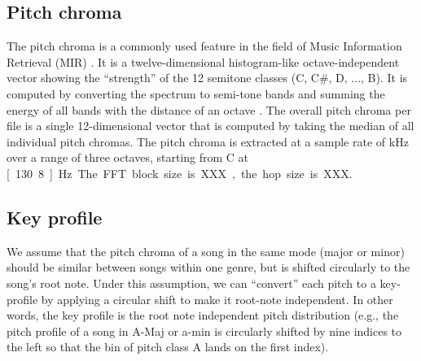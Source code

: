 \documentclass{article}
\begin{document}
\subsection{Pitch chroma}\label{subsec:pc_extract}
The pitch chroma is a commonly used feature in the field of Music Information Retrieval (MIR) \cite{muller_information_2007}. It is a twelve-dimensional histogram-like octave-independent vector showing the “strength” of the 12 semitone classes (C, C\#, D, ..., B). It is computed by converting the spectrum to semi-tone bands and summing the energy of all bands with the distance of an octave \cite{fujishima_realtime_1999}. The overall pitch chroma per file is a single 12-dimensional vector that is computed by taking the median of all individual pitch chromas. 
The pitch chroma is extracted at a sample rate of \unit[10]{kHz} over a range of three octaves, starting from C at \unit[130.8]{Hz}. The FFT block size is XXX, the hop size is XXX.



\subsection{Key profile}
We assume that the pitch chroma of a song in the same mode (major or minor) should be similar between songs within one genre, but is shifted circularly to the song's root note. Under this assumption, we can ``convert'' each pitch to a key-profile by applying a circular shift to make it root-note independent. In other words, the key profile is the root note independent pitch distribution (e.g., the pitch profile of a song in A-Maj or a-min is circularly shifted by nine indices to the left so that the bin of pitch class A lands on the first index).

\end{document}
